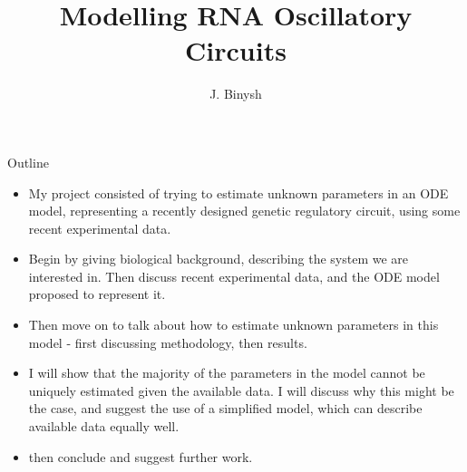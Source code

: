 \documentclass[8pt]{beamer}
\title %
{Modelling RNA Oscillatory Circuits}
\subtitle
{}
\author %
{J. Binysh\inst{1}}
\institute[University of Warwick] %
{
  \inst{1}%
 	Centre for Complexity Science\\
  University of Warwick
 }
\begin{document}
\begin{frame}
  \titlepage
\end{frame}

\begin{frame}{Outline}
\begin{itemize}
\item My project consisted of trying to estimate unknown parameters in an ODE model, representing a recently designed genetic regulatory circuit, using some recent experimental data.
\item Begin by giving biological background, describing the system we are interested in. Then discuss recent experimental data, and the ODE model proposed to represent it.
\item Then move on to talk about how to estimate unknown parameters in this model - first discussing methodology, then results.
\item I will show that the majority of the parameters in the model cannot be uniquely estimated given the available data. I will discuss why this might be the case, and suggest the use of a simplified model, which can describe available data equally well.
\item then conclude and suggest further work.
\end{itemize}
\end{frame}
\end{document}
